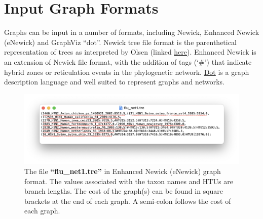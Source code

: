 \documentclass[11pt]{book}
\begin{document}
{{\section{Input Graph Formats}
	Graphs can be input in a number of formats, including Newick, Enhanced Newick (eNewick)
	and GraphViz ``dot''. Newick tree file format is the parenthetical representation of trees as 
	interpreted by Olsen (linked \href{https://evolution.genetics.washington.edu/phylip/newick_doc.html}
	{here}). Enhanced Newick \cite{Cardonaetal2008} is an extension of Newick file 
	format, with the addition of tags (`\#') that indicate hybrid zones or reticulation events
	in the phylogenetic network. \href{https://graphviz.org/}{Dot} is a graph description 
	language and well suited to represent graphs and networks. 	
	
	\begin{figure}%
	\centering
	\includegraphics[width=\textwidth]{enewick.png}
	\caption{The file \textbf{``flu\_net1.tre''} in Enhanced Newick (eNewick) graph format. The 
	values associated with the taxon names and HTUs are branch lengths. The cost of the 
	graph(s) can be found in square brackets at the end of each graph. A semi-colon follows
	the cost of each graph.}
	\label{enewick}
	\end{figure}
	
}}
\end{document}
